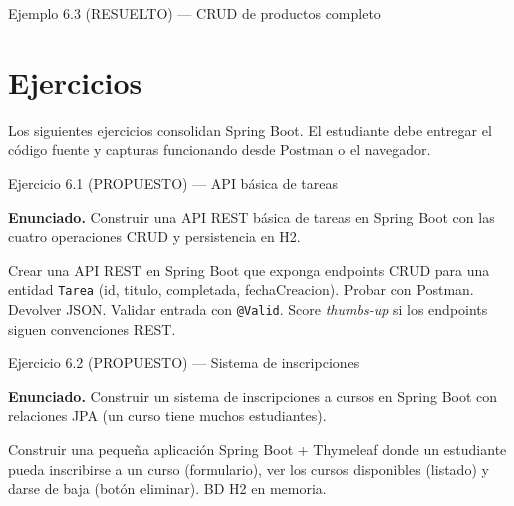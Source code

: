 \documentclass[11pt,a4paper,openany]{book}
\begin{document}
\begin{cajaejemplo}{Ejemplo 6.3 (RESUELTO) --- CRUD de productos completo}
\end{cajaejemplo}

\section{Ejercicios}

Los siguientes ejercicios consolidan Spring Boot. El
estudiante debe entregar el código fuente y capturas funcionando
desde Postman o el navegador.


\begin{cajaejercicio}{Ejercicio 6.1 (PROPUESTO) --- API básica de tareas}


\textbf{Enunciado.} Construir una API REST básica de tareas en Spring Boot con las cuatro operaciones CRUD y persistencia en H2.

Crear una API REST en Spring Boot que exponga endpoints CRUD para
una entidad \texttt{Tarea} (id, titulo, completada, fechaCreacion).
Probar con Postman. Devolver JSON. Validar entrada con
\texttt{@Valid}. Score \emph{thumbs-up} si los endpoints siguen
convenciones REST.
\end{cajaejercicio}

\begin{cajaejercicio}{Ejercicio 6.2 (PROPUESTO) --- Sistema de inscripciones}


\textbf{Enunciado.} Construir un sistema de inscripciones a cursos en Spring Boot con relaciones JPA (un curso tiene muchos estudiantes).

Construir una pequeña aplicación Spring Boot + Thymeleaf donde un
estudiante pueda inscribirse a un curso (formulario), ver los cursos
disponibles (listado) y darse de baja (botón eliminar). BD H2 en
memoria.
\end{cajaejercicio}
\end{document}

